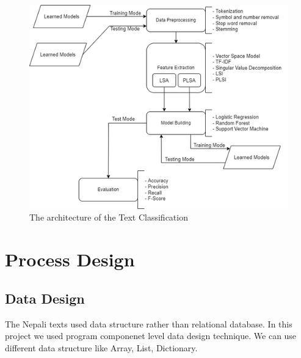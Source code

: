 \documentclass[12pt]{report}
\begin{document}
                \begin{figure}[h!]
                        \centering
                        \includegraphics[scale=0.8]{system_architeture.png}
                        \caption{The architecture of the Text Classification}
                   
                \end{figure}
        \section{Process Design}
        \subsection{Data Design}
        The Nepali texts used data structure rather than relational database. In this project we used program componenet level data design technique. We can use
        different data structure like Array, List, Dictionary.
\end{document}
